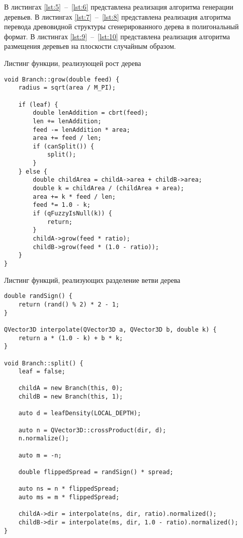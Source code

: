 В листингах \ref{lst:5}~--~\ref{lst:6} представлена реализация алгоритма генерации деревьев. В листингах \ref{lst:7}~--~\ref{lst:8} представлена реализация алгоритма перевода древовидной структуры сгенерированного дерева в полигональный формат. В листингах \ref{lst:9}~--~\ref{lst:10} представлена реализация алгоритма размещения деревьев на плоскости случайным образом.

\begin{code}
\caption{Листинг функции, реализующей рост дерева}
\label{lst:5}
\begin{verbatim}
void Branch::grow(double feed) {
    radius = sqrt(area / M_PI);

    if (leaf) {
        double lenAddition = cbrt(feed);
        len += lenAddition;
        feed -= lenAddition * area;
        area += feed / len;
        if (canSplit()) {
            split();
        }
    } else {
        double childArea = childA->area + childB->area;
        double k = childArea / (childArea + area);
        area += k * feed / len;
        feed *= 1.0 - k;
        if (qFuzzyIsNull(k)) {
            return;
        }
        childA->grow(feed * ratio);
        childB->grow(feed * (1.0 - ratio));
    }
}
\end{verbatim}
\end{code}

\newpage
\begin{code}
\caption{Листинг функций, реализующих разделение ветви дерева}
\label{lst:6}
\begin{verbatim}
double randSign() {
    return (rand() % 2) * 2 - 1;
}

QVector3D interpolate(QVector3D a, QVector3D b, double k) {
    return a * (1.0 - k) + b * k;
}

void Branch::split() {
    leaf = false;

    childA = new Branch(this, 0);
    childB = new Branch(this, 1);

    auto d = leafDensity(LOCAL_DEPTH);

    auto n = QVector3D::crossProduct(dir, d);
    n.normalize();

    auto m = -n;

    double flippedSpread = randSign() * spread;

    auto ns = n * flippedSpread;
    auto ms = m * flippedSpread;

    childA->dir = interpolate(ns, dir, ratio).normalized();
    childB->dir = interpolate(ms, dir, 1.0 - ratio).normalized();
}
\end{verbatim}
\end{code}

